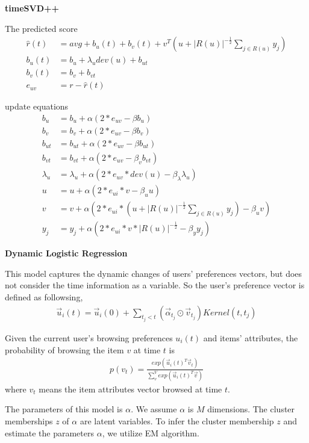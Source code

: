 \documentclass[11pt]{article}
\begin{document}
\textbf{timeSVD++}

The predicted score 
\begin{align*}
    \hat{r}(t) &= avg+b_u(t)+b_v(t)+v^T(u+|R(u)|^{-\frac{1}{2}}\sum_{j\in R(u)}y_j)\\
    b_u(t) &= b_u+\lambda_u dev(u)+b_{ut} \\
    b_v(t) &= b_v+b_{vt} \\
    e_{uv} &= r-\hat{r}(t)
\end{align*}

update equations
\begin{align*}
b_u &= b_u+\alpha(2*e_{uv}-\beta b_u) \\
b_v &= b_v+\alpha(2*e_{uv}-\beta b_v) \\
b_{ut} &= b_{ut}+\alpha(2*e_{uv}-\beta b_{ut})\\
b_{vt} &= b_{vt}+\alpha(2*e_{uv}-\beta_v b_{vt})\\
\lambda_{u} &= \lambda_{u}+\alpha(2*e_{uv}*dev(u)-\beta_{\lambda}\lambda_{u}) \\
u &= u+\alpha(2*e_{ui}*v-\beta_u u) \\
v &= v+\alpha(2*e_{ui}*(u+|R(u)|^{-\frac{1}{2}}\sum_{j\in R(u)}y_j)-\beta_u v)\\
y_j &= y_j+\alpha(2*e_{ui}*v*|R(u)|^{-\frac{1}{2}}-\beta_y y_j)
\end{align*}


\textbf{Dynamic Logistic Regression}

This model captures the dynamic changes of users' preferences vectors, but does not consider the time information as a variable. So the user's preference vector is defined as followsing, 
\begin{align}
\label{user_preference_vec}
\vec{u}_i(t) = \vec{u}_i(0)+\sum_{t_j<t} (\vec{\alpha}_{t_j}\odot\vec{v}_{t_j}) Kernel(t,t_j)
\end{align}

Given the current user's browsing preferences $u_i(t)$ and items' attributes, the probability of browsing the item $v$ at time $t$ is
\begin{align}\label{itemProbability}
p(v_t) = \frac{exp(\vec{u}_i(t)^T\vec{v}_t)}{\sum^V_v exp(\vec{u}_i(t)^T\vec{v})}
\end{align}
where $v_t$ means the item attributes vector browsed at time $t$. 

The parameters of this model is $\alpha$. We assume $\alpha$ is $M$ dimensions. The cluster memberships $z$ of $\alpha$ are latent variables. To infer the cluster membership $z$ and estimate the parameters $\alpha$, we utilize EM algorithm. 
\end{document}
